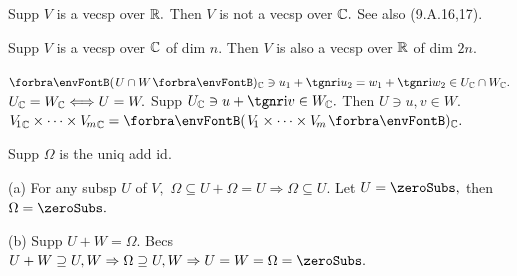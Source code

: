 \BulletPointX{}\;\;Supp $V$ is a vecsp over ${\mathbb{R}}.$ Then $V$ is not a vecsp over ${\mathbb{C}}.$ See also (9.A.16,17).\par
\BulletPointX\AComm Supp $V$ is a vecsp over ${\mathbb{C}}$ of dim $n.$ Then $V$ is also a vecsp over ${\mathbb{R}}$ of dim $2n.$\vspace{-4pt}
\SepLine


\BulletPointX{}\par
{} \qquad {}\PfEnd
{}\PfEnd{}
\PfEnd
\BulletPointX{ \quad}$\Par{U\cap W}{_\Cbb}\ni u_1+\i u_2=w_1+\i w_2\in U_\Cbb\cap W_\Cbb.$\PfEnd
\BulletPointX{ \quad}$U_{\mathbb{C}}=W_{\mathbb{C}}\Longleftrightarrow U=W.$ \;Supp $U_\Cbb\ni u+\i v\in W_\Cbb.$ Then $U\ni u,v\in W.$\PfEnd
\BulletPointX{ \quad}${V_{\!1}}_\Cbb\times\cdots\times{V_{\!m}}_\Cbb=\Par{V_{\!1}\times\cdots\times V_{\!m}}{_\Cbb}.$\PfEnd
\SepLine


Supp $\Omega$ is the uniq add id.\par\quad
(a) For any subsp $U$ of $V,$ $\Omega\subseteq U+\Omega=U\Rightarrow\Omega\subseteq U$. Let $U=\zeroSubs,$ then $\Omega=\zeroSubs.$\par\quad
(b) Supp $U+W=\Omega.$ Becs $U+W\supseteq U,W\Rightarrow \Omega\supseteq U,W\Rightarrow U=W=\Omega=\zeroSubs.$\PfEnd
\SepLine

